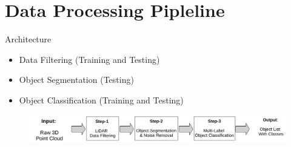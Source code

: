 \documentclass[9pt]{beamer}
\begin{document}

\section{Data Processing Pipleline}



\begin{frame}[fragile]{Architecture}
\begin{itemize}
	\item {} Data Filtering (Training and Testing)
	\item {} Object Segmentation (Testing)
	\item {} Object Classification (Training and Testing)
\end{itemize}

\begin{figure}
	\centering
	\includegraphics[width=\textwidth]{images/DataProcessingPipleline.pdf}

\end{figure}
\end{frame}


\end{document}
